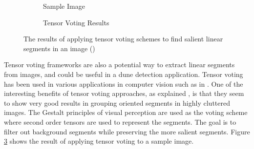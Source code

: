 
\begin{figure}
	\centering
	\begin{subfigure}{0.35\textwidth}
		\centering
		\caption{ Sample Image }
		\label{fig:tensor_voting_input}
	\end{subfigure}
	\begin{subfigure}{0.35\textwidth}
		\centering
		\caption{ Tensor Voting Results }
		\label{fig:tensor_voting_output}
	\end{subfigure}
	\caption{ The results of applying tensor voting schemes to find salient linear segments in an image (\cite{2009_tensor_voting_cluttered_backgrounds}) }
	\label{fig:tensor_voting_results}
\end{figure}

Tensor voting frameworks are also a potential way to extract linear segments from images, and could be useful in a dune detection application. Tensor voting has been used in various applications in computer vision such as in \cite{2006_tensor_voting_video_repairing,2005_tensor_voting_image_correction,2006_tensor_voting_stereo_monocular,2005_tensor_voting_visual_motion_analysis,2001_tensor_voting_epipolar_geometry}. One of the interesting benefits of tensor voting approaches, as explained \cite{2009_tensor_voting_cluttered_backgrounds}, is that they seem to show very good results in grouping oriented segments in highly cluttered images. The Gestalt principles of visual perception are used as the voting scheme where second order tensors are used to represent the segments. The goal is to filter out background segments while preserving the more salient segments. Figure \ref{fig:tensor_voting_results} shows the result of applying tensor voting to a sample image.

